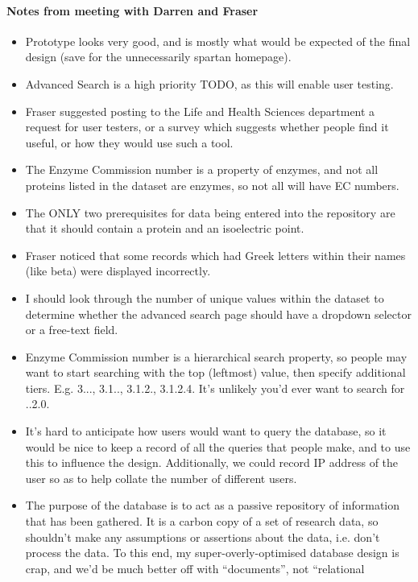 \paragraph{Notes from meeting with Darren and Fraser}
\begin{itemize}
\item Prototype looks very good, and is mostly what would be expected of the
  final design (save for the unnecessarily spartan homepage).
\item Advanced Search is a high priority TODO, as this will enable user
  testing.
\item Fraser suggested posting to the Life and Health Sciences department a
  request for user testers, or a survey which suggests whether people find it
  useful, or how they would use such a tool.
\item The Enzyme Commission number is a property of enzymes, and not all
  proteins listed in the dataset are enzymes, so not all will have EC numbers.
\item The ONLY two prerequisites for data being entered into the repository are
  that it should contain a protein and an isoelectric point.
\item Fraser noticed that some records which had Greek letters within their
  names (like beta) were displayed incorrectly.
\item I should look through the number of unique values within the dataset to
  determine whether the advanced search page should have a dropdown selector or
  a free-text field.
\item Enzyme Commission number is a hierarchical search property, so people may
  want to start searching with the top (leftmost) value, then specify additional
  tiers. E.g. 3..., 3.1.., 3.1.2., 3.1.2.4. It's unlikely you'd ever want to
  search for ..2.0.
\item It's hard to anticipate how users would want to query the database, so it
  would be nice to keep a record of all the queries that people make, and to use
  this to influence the design. Additionally, we could record IP address of the
  user so as to help collate the number of different users.
\item The purpose of the database is to act as a passive repository of
  information that has been gathered. It is a carbon copy of a set of research
  data, so shouldn't make any assumptions or assertions about the data,
  i.e. don't process the data. To this end, my super-overly-optimised database
  design is crap, and we'd be much better off with ``documents'', not ``relational

\end{itemize}
